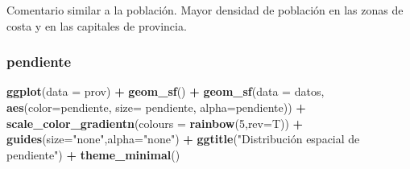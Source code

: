 \documentclass[12pt,a4paper,]{book}
\newenvironment{Shaded}{\begin{snugshade}}{\end{snugshade}}
\newcommand{\AttributeTok}[1]{\textcolor[rgb]{0.13,0.29,0.53}{#1}}
\newcommand{\CommentTok}[1]{\textcolor[rgb]{0.56,0.35,0.01}{\textit{#1}}}
\newcommand{\DecValTok}[1]{\textcolor[rgb]{0.00,0.00,0.81}{#1}}
\newcommand{\FunctionTok}[1]{\textcolor[rgb]{0.13,0.29,0.53}{\textbf{#1}}}
\newcommand{\NormalTok}[1]{#1}
\newcommand{\SpecialCharTok}[1]{\textcolor[rgb]{0.81,0.36,0.00}{\textbf{#1}}}
\newcommand{\StringTok}[1]{\textcolor[rgb]{0.31,0.60,0.02}{#1}}
\numberwithin{dummy}{section}
\theoremstyle{ocrenumbox}
\theoremstyle{blacknumex}
\theoremstyle{blacknumbox}
\theoremstyle{ocrenum}
\theoremstyle{ocrenum}
\begin{document}
\begin{Shaded}
\end{Shaded}

Comentario similar a la población. Mayor densidad de población en las
zonas de costa y en las capitales de provincia.

\hypertarget{pendiente}{%
\subsubsection*{pendiente}\label{pendiente}}

\begin{Shaded}
\begin{Highlighting}[]
\FunctionTok{ggplot}\NormalTok{(}\AttributeTok{data =}\NormalTok{ prov) }\SpecialCharTok{+} 
  \FunctionTok{geom\_sf}\NormalTok{() }\SpecialCharTok{+}
  \FunctionTok{geom\_sf}\NormalTok{(}\AttributeTok{data =}\NormalTok{ datos, }\FunctionTok{aes}\NormalTok{(}\AttributeTok{color=}\NormalTok{pendiente, }\AttributeTok{size=}\NormalTok{ pendiente, }\AttributeTok{alpha=}\NormalTok{pendiente)) }\SpecialCharTok{+}
    \FunctionTok{scale\_color\_gradientn}\NormalTok{(}\AttributeTok{colours =} \FunctionTok{rainbow}\NormalTok{(}\DecValTok{5}\NormalTok{,}\AttributeTok{rev=}\NormalTok{T)) }\SpecialCharTok{+}
  \FunctionTok{guides}\NormalTok{(}\AttributeTok{size=}\StringTok{"none"}\NormalTok{,}\AttributeTok{alpha=}\StringTok{"none"}\NormalTok{) }\SpecialCharTok{+}
  \FunctionTok{ggtitle}\NormalTok{(}\StringTok{"Distribución espacial de pendiente"}\NormalTok{) }\SpecialCharTok{+}
  \FunctionTok{theme\_minimal}\NormalTok{()}
\end{Highlighting}
\end{Shaded}
\end{document}

